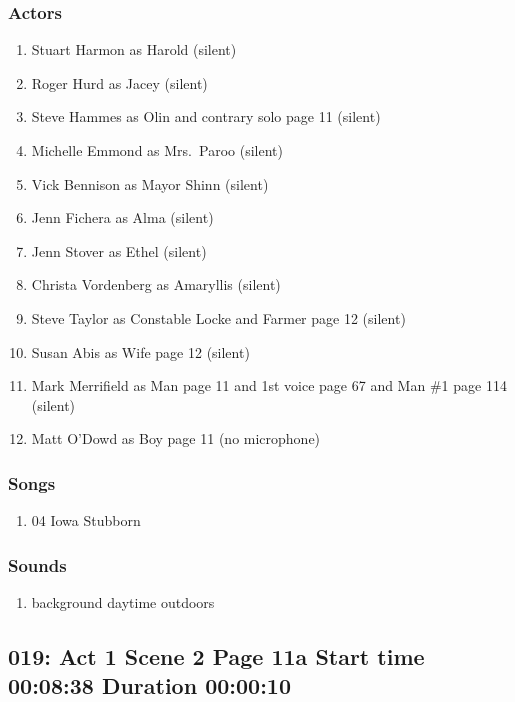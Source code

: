\subsubsection{Actors}
\begin{enumerate}
\item Stuart Harmon as Harold (silent)
\item Roger Hurd as Jacey (silent)
\item Steve Hammes as Olin and contrary solo page 11 (silent)
\item Michelle Emmond as Mrs.~Paroo (silent)
\item Vick Bennison as Mayor Shinn (silent)
\item Jenn Fichera as Alma (silent)
\item Jenn Stover as Ethel (silent)
\item Christa Vordenberg as Amaryllis (silent)
\item Steve Taylor as Constable Locke and Farmer page 12 (silent)
\item Susan Abis as Wife page 12 (silent)
\item Mark Merrifield as Man page 11 and 1st voice page 67 and Man \#1 page 114 (silent)
\item Matt O'Dowd as Boy page 11 (no microphone)
\end{enumerate}

\subsubsection{Songs}
\begin{enumerate}
\item 04 Iowa Stubborn
\end{enumerate}\subsubsection{Sounds}
\begin{enumerate}
\item background daytime outdoors
\end{enumerate}
\subsection{019: Act 1 Scene 2 Page 11a Start time 00:08:38 Duration 00:00:10}

